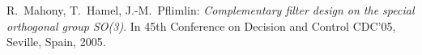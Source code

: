 
\begin{thebibliography}{99}



 {\sc R.~Mahony, T.~Hamel, J.-M.~Pflimlin}:
{\it Complementary filter design on the special orthogonal group SO(3)}. In 45th Conference
on Decision and Control CDC'05, Seville, Spain, 2005.


\end{thebibliography}
